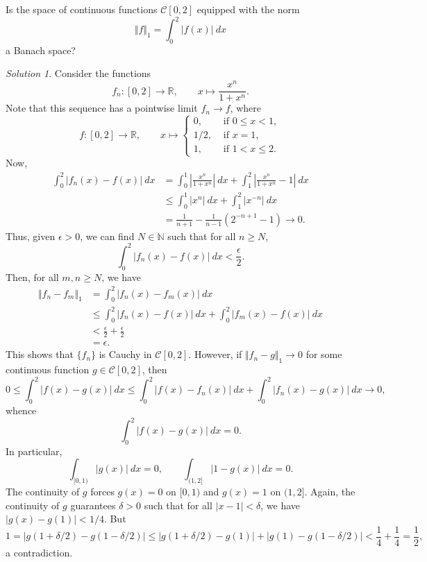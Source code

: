 \documentclass[11pt]{article}
\newcommand{\R}{\mathbb{R}}
\newcommand{\N}{\mathbb{N}}
\newcommand{\norm}[1]{\Vert #1 \Vert}
\theoremstyle{definition}
\theoremstyle{remark}
\newtheorem*{solution}{Solution}
\begin{document}
    \begin{exercise}
        Is the space of continuous functions $\mathcal{C}[0, 2]$ equipped with the
        norm \[
            \norm{f}_1 = \int_0^2 |f(x)|\:dx
        \] a Banach space?
        \begin{solution}
            Consider the functions \[
                f_n\colon [0, 2] \to \R, \qquad x \mapsto \frac{x^n}{1 + x^n}.
            \] Note that this sequence has a pointwise limit $f_n \to f$, where \[
                f\colon [0, 2] \to \R, \qquad x \mapsto \begin{cases}
                    0, &\text{ if } 0 \leq x < 1, \\
                    1 / 2, &\text{ if } x = 1, \\
                    1, &\text{ if } 1 < x \leq 2.
                \end{cases}
            \] Now, \begin{align*}
                \int_0^2 |f_n(x) - f(x)|\:dx
                &= \int_0^1 \left|\frac{x^n}{1 + x^n}\right|\:dx + \int_1^2
                \left|\frac{x^n}{1 + x^n} - 1\right|\:dx \\
                &\leq \int_0^1 |x^n|\:dx + \int_1^2 |x^{-n}|\:dx \\
                &= \frac{1}{n + 1} - \frac{1}{n - 1}(2^{-n + 1} - 1) \to 0.
            \end{align*}
            Thus, given $\epsilon > 0$, we can find $N \in \N$ such that for all $n
            \geq N$, \[
                \int_0^2 |f_n(x) - f(x)|\:dx < \frac{\epsilon}{2}.
            \] Then, for all $m, n \geq N$, we have \begin{align*}
                \norm{f_n - f_m}_1 &= \int_0^2 |f_n(x) - f_m(x)|\:dx \\
                &\leq \int_0^2 |f_n(x) - f(x)| \:dx + \int_0^2 |f_m(x) - f(x)|\:dx \\
                &< \frac{\epsilon}{2} + \frac{\epsilon}{2} \\
                &= \epsilon.
            \end{align*}
            This shows that $\{f_n\}$ is Cauchy in $\mathcal{C}[0, 2]$. However, if
            $\norm{f_n - g}_1 \to 0$ for some continuous function $g \in
            \mathcal{C}[0, 2]$, then \[
                0 \leq \int_0^2 |f(x) - g(x)|\:dx \leq \int_0^2 |f(x) - f_n(x)|\:dx +
                \int_0^2 |f_n(x) - g(x)|\:dx \to 0,
            \] whence \[
                \int_0^2 |f(x) - g(x)|\:dx = 0.
            \] In particular, \[
                \int_{[0, 1)} |g(x)|\:dx = 0, \qquad \int_{(1, 2]} |1
                - g(x)|\:dx = 0.
            \] The continuity of $g$ forces $g(x) = 0$ on $[0, 1)$
            and $g(x) = 1$ on $(1, 2]$. Again, the continuity of $g$ guarantees
            $\delta > 0$ such that for all $|x - 1| < \delta$, we have $|g(x) - g(1)|
            < 1 / 4$.  But \[
                1 = |g(1 + \delta / 2) - g(1 - \delta / 2)| \leq |g(1 + \delta / 2) -
                g(1)| + |g(1) - g(1 - \delta / 2)| < \frac{1}{4} + \frac{1}{4} =
                \frac{1}{2},
            \] a contradiction.


\end{solution}
\end{exercise}
\end{document}
